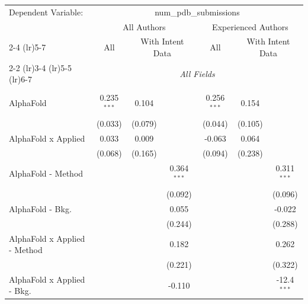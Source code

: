 \begingroup
\centering
\begin{tabular}{lcccccc}
   \tabularnewline \midrule \midrule
   Dependent Variable: & \multicolumn{6}{c}{num\_pdb\_submissions}\\
 & \multicolumn{3}{c}{All Authors} & \multicolumn{3}{c}{Experienced Authors} \\
\cmidrule(lr){2-4} \cmidrule(lr){5-7}
 & \multicolumn{1}{c}{All} & \multicolumn{2}{c}{With Intent Data} & \multicolumn{1}{c}{All} & \multicolumn{2}{c}{With Intent Data} \\
\cmidrule(lr){2-2} \cmidrule(lr){3-4} \cmidrule(lr){5-5} \cmidrule(lr){6-7}
 & \multicolumn{6}{c}{\textit{All Fields}} \\ \\
   AlphaFold                      & 0.235$^{***}$ & 0.104         &               & 0.256$^{***}$ & 0.154          &   \\   
                                  & (0.033)       & (0.079)       &               & (0.044)       & (0.105)        &   \\   
   AlphaFold x Applied            & 0.033         & 0.009         &               & -0.063        & 0.064          &   \\   
                                  & (0.068)       & (0.165)       &               & (0.094)       & (0.238)        &   \\   
   AlphaFold - Method             &               &               & 0.364$^{***}$ &               &                & 0.311$^{***}$\\   
                                  &               &               & (0.092)       &               &                & (0.096)\\   
   AlphaFold - Bkg.               &               &               & 0.055         &               &                & -0.022\\   
                                  &               &               & (0.244)       &               &                & (0.288)\\   
   AlphaFold x Applied - Method   &               &               & 0.182         &               &                & 0.262\\   
                                  &               &               & (0.221)       &               &                & (0.322)\\   
   AlphaFold x Applied - Bkg.     &               &               & -0.110        &               &                & -12.4$^{***}$\\   

\end{tabular}

